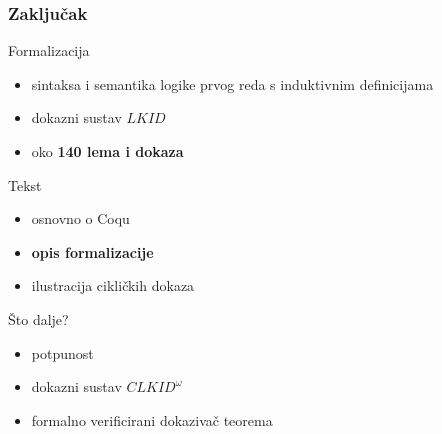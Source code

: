 \documentclass{beamer}
\begin{document}
\begin{frame}
  \frametitle{Zaključak}
  Formalizacija
  \begin{itemize}
  \item sintaksa i semantika logike prvog reda s induktivnim definicijama
  \item dokazni sustav \(\mathit{LKID}\)
  \item oko \textbf{140 lema i dokaza}
  \end{itemize}
  Tekst
  \begin{itemize}
  \item osnovno o Coqu
  \item \textbf{opis formalizacije}
  \item ilustracija cikličkih dokaza
  \end{itemize}
  Što dalje?
  \begin{itemize}
  \item potpunost
  \item dokazni sustav \(\mathit{CLKID}^{\omega}\)
  \item formalno verificirani dokazivač teorema
  \end{itemize}
\end{frame}
\end{document}
